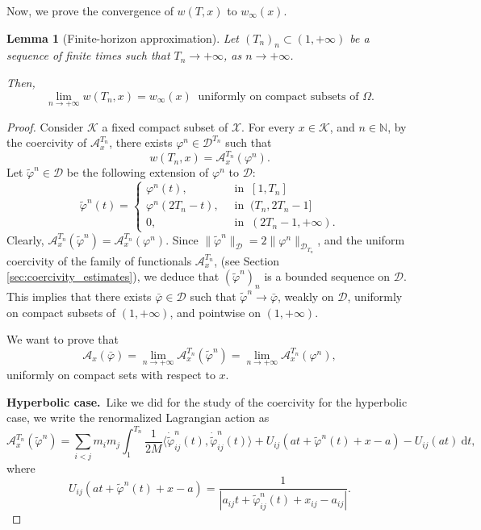 \documentclass[a4paper,10pt]{amsart}
\newcommand{\ud}{\mathrm{d}}
\theoremstyle{plain}
\newtheorem{lem}[thm]{Lemma}
\theoremstyle{definition}
\numberwithin{equation}{section}
\numberwithin{thm}{section}
\begin{document}
Now, we prove the convergence of $w(T,x)$ to $w_\infty(x)$.

\begin{lem}[Finite-horizon approximation]
\label{lem:unif_conv}
Let $(T_n)_n \subset (1,+\infty)$ be a sequence of finite times such that $T_n \to +\infty$, as $n \to +\infty$. 

Then, 
\[
\lim_{n \to +\infty} w(T_n,x)=w_\infty(x) \ \mbox{ uniformly on compact subsets of $\Omega$}.
\]
\end{lem}

\begin{proof}
    Consider $\mathcal K$ a fixed compact subset of $\mathcal{X}$. For every $x \in \mathcal K$, and $n \in \mathbb N$, by the coercivity of $\mathcal{A}_{x}^{T_n}$, there exists $\varphi^n \in \mathcal{D}^{T_n}$ such that
    \[
    w(T_n,x)=\mathcal{A}_{x}^{T_n}(\varphi^n).
    \]
    Let $\tilde\varphi^n \in \mathcal{D}$ be the following extension of $\varphi^n$ to $\mathcal{D}$:
    \[
\tilde \varphi^n(t)=
\begin{cases}
    \varphi^n(t), \ &\mbox{ in } \ [1,T_n]
    \\
    \varphi^n(2T_n-t), \ &\mbox{ in }  \ (T_n,2T_n-1]
    \\
    0, \ &\mbox{ in } \ (2T_n-1,+\infty).
\end{cases}
\]
Clearly, $\mathcal{A}_{x}^{T_n}(\tilde \varphi^n)=\mathcal{A}_{x}^{T_n}(\varphi^n)$. Since $\|\tilde\varphi^n\|_\mathcal{D} = 2 \|\varphi^n\|_{\mathcal{D}_{T_n}}$, and the uniform coercivity of the family of functionals $\mathcal{A}_{x}^{T_n}$, (see Section \ref{sec:coercivity_estimates}), we deduce that $(\tilde\varphi^n)_n$ is a bounded sequence on $\mathcal{D}$. This implies that there exists $\bar\varphi \in \mathcal{D}$ such that $\tilde\varphi^n \to \bar \varphi$, weakly on $\mathcal{D}$, uniformly on compact subsets of $(1,+\infty)$, and pointwise on $(1,+\infty)$. 

We want to prove that
\[
\mathcal{A}_{x}(\bar\varphi) = \lim_{n\rightarrow+\infty}\mathcal{A}_{x}^{T_n}(\tilde\varphi^n) = \lim_{n\to+\infty}\mathcal{A}_{x}^{T_n}(\varphi^n),
\]
uniformly on compact sets with respect to $x$.

\smallskip
\textbf{Hyperbolic case.}\ Like we did for the study of the coercivity for the hyperbolic case, we write the renormalized Lagrangian action as
\[
\mathcal{A}_{x}^{T_n}(\tilde\varphi^n) = \sum_{i<j}m_i m_j \int_{1}^{T_n}\frac{1}{2M} \langle\dot{\tilde\varphi}_{ij}^n(t),\dot{\tilde\varphi}_{ij}^n(t)\rangle + U_{ij}(at + \tilde\varphi^n(t)+x-a)-U_{ij}(at)\ \ud t,
\]
where 
\[
U_{ij}(at+\tilde\varphi^n(t)+x-a) = \frac{1}{|a_{ij}t + \tilde\varphi^n_{ij}(t)+x_{ij}-a_{ij}|}.
\]


\end{proof}
\end{document}
